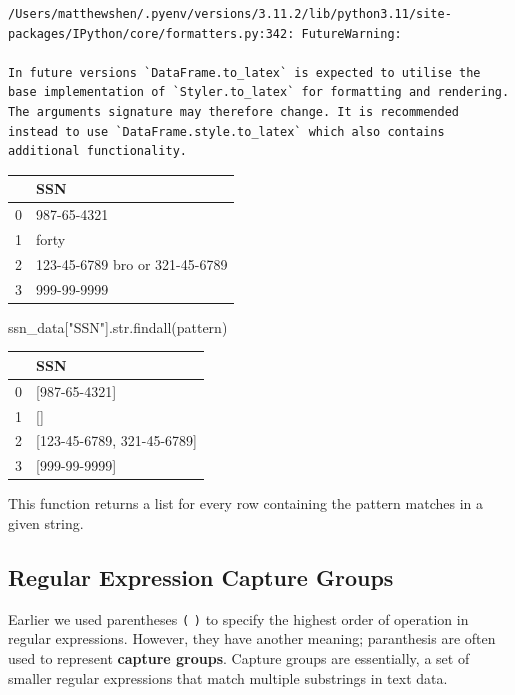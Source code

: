 \documentclass[
  letterpaper,
  DIV=11,
  numbers=noendperiod]{scrreprt}
\newenvironment{Shaded}{\begin{snugshade}}{\end{snugshade}}
\newcommand{\BuiltInTok}[1]{\textcolor[rgb]{0.00,0.23,0.31}{#1}}
\newcommand{\NormalTok}[1]{\textcolor[rgb]{0.00,0.23,0.31}{#1}}
\newcommand{\StringTok}[1]{\textcolor[rgb]{0.13,0.47,0.30}{#1}}
\begin{document}
\begin{verbatim}
/Users/matthewshen/.pyenv/versions/3.11.2/lib/python3.11/site-packages/IPython/core/formatters.py:342: FutureWarning:

In future versions `DataFrame.to_latex` is expected to utilise the base implementation of `Styler.to_latex` for formatting and rendering. The arguments signature may therefore change. It is recommended instead to use `DataFrame.style.to_latex` which also contains additional functionality.
\end{verbatim}

\begin{tabular}{ll}
\toprule
{} &                             SSN \\
\midrule
0 &                     987-65-4321 \\
1 &                           forty \\
2 &  123-45-6789 bro or 321-45-6789 \\
3 &                     999-99-9999 \\
\bottomrule
\end{tabular}

\begin{Shaded}
\begin{Highlighting}[]
\NormalTok{ssn\_data[}\StringTok{"SSN"}\NormalTok{].}\BuiltInTok{str}\NormalTok{.findall(pattern)}
\end{Highlighting}
\end{Shaded}

\begin{tabular}{ll}
\toprule
{} &                         SSN \\
\midrule
0 &               [987-65-4321] \\
1 &                          [] \\
2 &  [123-45-6789, 321-45-6789] \\
3 &               [999-99-9999] \\
\bottomrule
\end{tabular}

This function returns a list for every row containing the pattern
matches in a given string.

\hypertarget{regular-expression-capture-groups}{%
\subsection{Regular Expression Capture
Groups}\label{regular-expression-capture-groups}}

Earlier we used parentheses \texttt{(} \texttt{)} to specify the highest
order of operation in regular expressions. However, they have another
meaning; paranthesis are often used to represent \textbf{capture
groups}. Capture groups are essentially, a set of smaller regular
expressions that match multiple substrings in text data.
\end{document}
